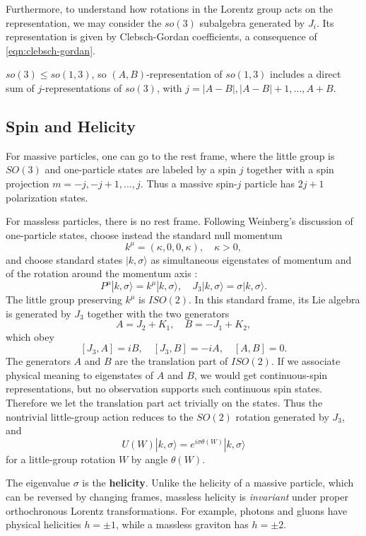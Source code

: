 Furthermore, to understand how rotations in the Lorentz group acts on the representation, we may consider the $so(3)$ subalgebra generated by $J_i$. Its representation is given by Clebsch-Gordan coefficients, a consequence of \eqref{eqn:clebsch-gordan}.

\begin{fact}
    $so(3) \leq so(1,3)$, so $(A,B)$-representation of $so(1,3)$ includes a direct sum of $j$-representations of $so(3)$, with $j = |A - B|, |A - B| + 1, \ldots, A + B$.
\end{fact}

\subsection{Spin and Helicity}
\label{subsec:spin-and-helicity}

For massive particles, one can go to the rest frame, where the little group is $SO(3)$ and one-particle states are labeled by a spin $j$ together with a spin projection $m = -j, -j+1, \ldots, j$. Thus a massive spin-$j$ particle has $2j+1$ polarization states.

For massless particles, there is no rest frame. Following Weinberg's discussion of one-particle states, choose instead the standard null momentum
\[
    k^\mu = (\kappa,0,0,\kappa), \quad \kappa > 0,
\]
and choose standard states $|k,\sigma\rangle$ as simultaneous eigenstates of momentum and of the rotation around the momentum axis \autocite[Chapter~2]{weinbergQFT1995}:
\[
    P^\mu |k,\sigma\rangle = k^\mu |k,\sigma\rangle, \quad
    J_3 |k,\sigma\rangle = \sigma |k,\sigma\rangle.
\]
The little group preserving $k^\mu$ is $ISO(2)$. In this standard frame, its Lie algebra is generated by $J_3$ together with the two generators
\[
    A = J_2 + K_1, \quad B = -J_1 + K_2,
\]
which obey
\[
    [J_3,A] = iB, \quad [J_3,B] = -iA, \quad [A,B] = 0.
\]
The generators $A$ and $B$ are the translation part of $ISO(2)$. If we associate physical meaning to eigenstates of $A$ and $B$, we would get continuous-spin representations, but no observation supports such continuous spin states. Therefore we let the translation part act trivially on the states. Thus the nontrivial little-group action reduces to the $SO(2)$ rotation generated by $J_3$, and
\[
    U(W)|k,\sigma\rangle = e^{i\sigma\theta(W)} |k,\sigma\rangle
\]
for a little-group rotation $W$ by angle $\theta(W)$.

The eigenvalue $\sigma$ is the \textbf{helicity}.
Unlike the helicity of a massive particle, which can be reversed by changing frames, massless helicity is \textit{invariant} under proper orthochronous Lorentz transformations. For example, photons and gluons have physical helicities $h = \pm 1$, while a massless graviton has $h = \pm 2$.


